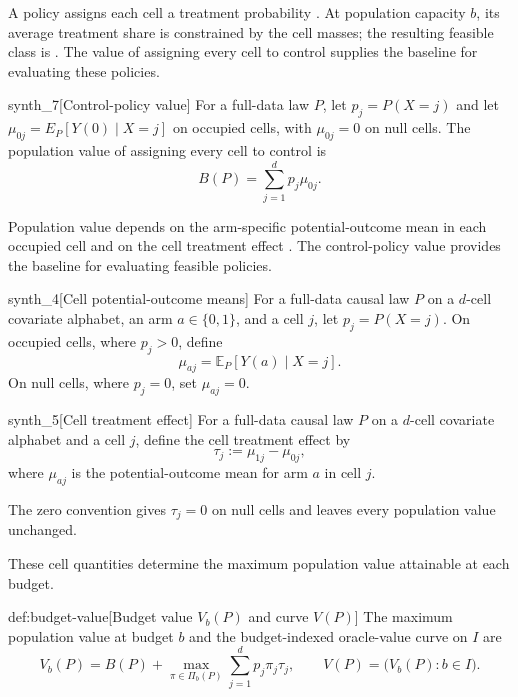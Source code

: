 \documentclass[11pt]{article}
\begin{document}
A policy assigns each cell a treatment probability . At population capacity \(b\), its average treatment share is constrained by the cell masses; the resulting feasible class is . The value of assigning every cell to control supplies the baseline for evaluating these policies.

\begin{definitionv}{synth_7}[Control-policy value]
For a full-data law \(P\), let \(p_j=P(X=j)\) and let \(\mu_{0j}=E_P[Y(0)\mid X=j]\) on occupied cells, with \(\mu_{0j}=0\) on null cells. The population value of assigning every cell to control is
\[
B(P)=\sum_{j=1}^d p_j\mu_{0j}.
\]
\end{definitionv}

Population value depends on the arm-specific potential-outcome mean  in each occupied cell and on the cell treatment effect . The control-policy value  provides the baseline for evaluating feasible policies.

\begin{definitionv}{synth_4}[Cell potential-outcome means]
For a full-data causal law \(P\) on a \(d\)-cell covariate alphabet, an arm \(a\in\{0,1\}\), and a cell \(j\), let \(p_j=P(X=j)\). On occupied cells, where \(p_j>0\), define
\[
\mu_{aj}=\mathbb E_P\!\left[Y(a)\mid X=j\right].
\]
On null cells, where \(p_j=0\), set \(\mu_{aj}=0\).
\end{definitionv}

\begin{definitionv}{synth_5}[Cell treatment effect]
For a full-data causal law \(P\) on a \(d\)-cell covariate alphabet and a cell \(j\), define the cell treatment effect by
\[
\tau_j := \mu_{1j}-\mu_{0j},
\]
where \(\mu_{aj}\) is the potential-outcome mean for arm \(a\) in cell \(j\).
\end{definitionv}

The zero convention gives \(\tau_j=0\) on null cells and leaves every population value unchanged.

These cell quantities determine the maximum population value attainable at each budget.

\begin{definitionv}{def:budget-value}[Budget value $V_b(P)$ and curve $V(P)$]
The maximum population value at budget \(b\) and the budget-indexed oracle-value curve on \(I\) are
\[
V_b(P)=B(P)+\max_{\pi\in\Pi_b(P)}\sum_{j=1}^d p_j\pi_j\tau_j,
\qquad
V(P)=\bigl(V_b(P):b\in I\bigr).
\]
\end{definitionv}
\end{document}
